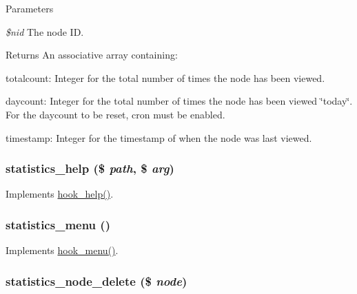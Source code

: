 \begin{DoxyParams}{Parameters}
\item[{\em \$nid}]The node ID.\end{DoxyParams}
\begin{DoxyReturn}{Returns}
An associative array containing:
\begin{DoxyItemize}
\item totalcount: Integer for the total number of times the node has been viewed.
\item daycount: Integer for the total number of times the node has been viewed \char`\"{}today\char`\"{}. For the daycount to be reset, cron must be enabled.
\item timestamp: Integer for the timestamp of when the node was last viewed. 
\end{DoxyItemize}
\end{DoxyReturn}
\hypertarget{statistics_8module_acd06f51782dd5b3b088970412c3480f5}{
\subsubsection[{statistics\_\-help}]{\setlength{\rightskip}{0pt plus 5cm}statistics\_\-help (\$ {\em path}, \/  \$ {\em arg})}}
\label{statistics_8module_acd06f51782dd5b3b088970412c3480f5}
Implements \hyperlink{group__hooks_ga5589c2714a782738e8851c4c90231f0e}{hook\_\-help()}. \hypertarget{statistics_8module_ad975827a39ea4d5986fc6ce1756cce34}{
\subsubsection[{statistics\_\-menu}]{\setlength{\rightskip}{0pt plus 5cm}statistics\_\-menu ()}}
\label{statistics_8module_ad975827a39ea4d5986fc6ce1756cce34}
Implements \hyperlink{group__hooks_ga5c95244fea59b25666e409759e133ded}{hook\_\-menu()}. \hypertarget{statistics_8module_ad05403b236249d273b4c19755a4f6b0a}{
\subsubsection[{statistics\_\-node\_\-delete}]{\setlength{\rightskip}{0pt plus 5cm}statistics\_\-node\_\-delete (\$ {\em node})}}
